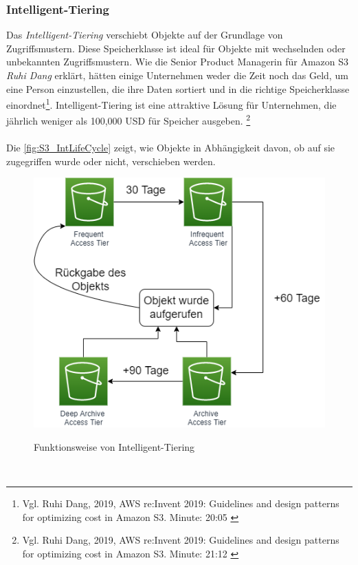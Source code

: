 \subsubsection{Intelligent-Tiering}
Das \textit{Intelligent-Tiering} verschiebt Objekte auf der Grundlage von Zugriffsmustern. Diese Speicherklasse ist ideal für Objekte mit wechselnden oder unbekannten Zugriffsmustern. Wie die Senior Product Managerin für Amazon S3 \textit{Ruhi Dang} erklärt, hätten einige Unternehmen weder die Zeit noch das Geld, um eine Person einzustellen, die ihre Daten sortiert und in die richtige Speicherklasse einordnet\footnote{Vgl. Ruhi Dang, 2019, AWS re:Invent 2019: Guidelines and design patterns for optimizing cost in Amazon S3. Minute: 20:05 \cite{AMZ16}}. Intelligent-Tiering ist eine attraktive Lösung für Unternehmen, die jährlich weniger als 100,000 USD für Speicher ausgeben. \footnote{Vgl. Ruhi Dang, 2019, AWS re:Invent 2019: Guidelines and design patterns for optimizing cost in Amazon S3. Minute: 21:12 \cite{AMZ16}}
\\\\
Die \autoref{fig:S3_IntLifeCycle} zeigt, wie Objekte in Abhängigkeit davon, ob auf sie zugegriffen wurde oder nicht, verschieben werden. 
\begin{figure}[h!]
  \centering
  \includegraphics[scale=0.7]{sources/S3_IntLifeCycle}
  \caption[Funktionsweise von Intelligent-Tiering]{}\label{fig:S3_IntLifeCycle} Funktionsweise von Intelligent-Tiering
\end{figure}\\
